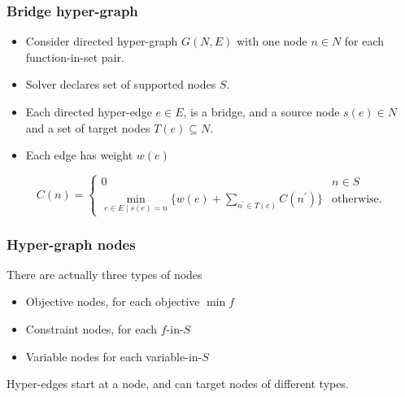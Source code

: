 \documentclass{beamer}
\begin{document}
\begin{frame}
  \frametitle{Bridge hyper-graph}
\begin{itemize}
    \item Consider directed hyper-graph $G(N, E)$ with one node $n\in N$ for each function-in-set pair.

    \item Solver declares set of supported nodes $S$.

    \item Each directed hyper-edge $e \in E$, is a bridge, and a source node $s(e)\in N$ and a set of target nodes $T(e) \subseteq N$.

    \item Each edge has weight $w(e)$
\end{itemize}

$$C(n) = \begin{cases}
0 & n \in S \\
\min\limits_{e\in E\;|\;s(e) = n}\{w(e) + \sum\limits_{n^\prime \in T(e)} C(n^\prime)\}&\text{otherwise}.
\end{cases}$$
\end{frame}

\begin{frame}
  \frametitle{Hyper-graph nodes}
There are actually three types of nodes
\begin{itemize}
    \item Objective nodes, for each objective $\min f$
    \item Constraint nodes, for each $f$-in-$S$
    \item Variable nodes for each variable-in-$S$
\end{itemize}
Hyper-edges start at a node, and can target nodes of different types.
\end{frame}
\end{document}
